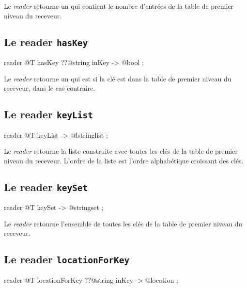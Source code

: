 Le \emph{reader}  retourne un  qui contient le nombre d'entrées de la table de premier niveau du receveur.



\subsection{Le reader \texttt{hasKey}}

\begin{galgascode}
reader @T hasKey ??@string inKey -> @bool ;
\end{galgascode}


Le \emph{reader}  retourne un  qui est  si la clé  est dans la table de premier niveau du receveur,  dans le cas contraire.



\subsection{Le reader \texttt{keyList}}

\begin{galgascode}
reader @T keyList -> @lstringlist ;
\end{galgascode}


Le \emph{reader}  retourne la liste construite avec toutes les clés de la table de premier niveau du receveur. L'ordre de la liste est l'ordre alphabétique croissant des clés.



\subsection{Le reader \texttt{keySet}}

\begin{galgascode}
reader @T keySet -> @stringset ;
\end{galgascode}


Le \emph{reader}  retourne l'ensemble de toutes les clés de la table de premier niveau du receveur.





\subsection{Le reader \texttt{locationForKey}}

\begin{galgascode}
reader @T locationForKey ??@string inKey -> @location ;
\end{galgascode}


